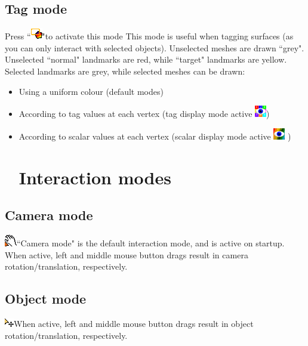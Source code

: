 \subsection{Tag mode}
Press ``\includegraphics{images/pixmap/Tag_select_mode.png}"to activate this mode
This mode is useful when tagging surfaces (as you can only interact with selected objects). Unselected meshes are drawn ``grey".  Unselected ``normal" landmarks are red, while ``target" landmarks are yellow. Selected landmarks are grey, while selected meshes can be drawn:
\begin{itemize}
\item	Using a uniform colour (default modes)
\item According to tag values at each vertex (tag display mode active \includegraphics{images/pixmap/Show_Tag_Window.png})
\item	According to scalar values at each vertex (scalar display mode active \includegraphics{images/pixmap/show_color_scale.png} )
\section{Interaction modes}
\end{itemize}

\subsection{Camera mode}
  \includegraphics{images/pixmap/move.png}``Camera mode" is the default interaction mode, and is active on startup. When active, left and middle mouse button drags result in camera rotation/translation, respectively.
\subsection{Object mode}
   \includegraphics{images/pixmap/move_mode2.png}When active, left and middle mouse button drags result in object rotation/translation, respectively.
